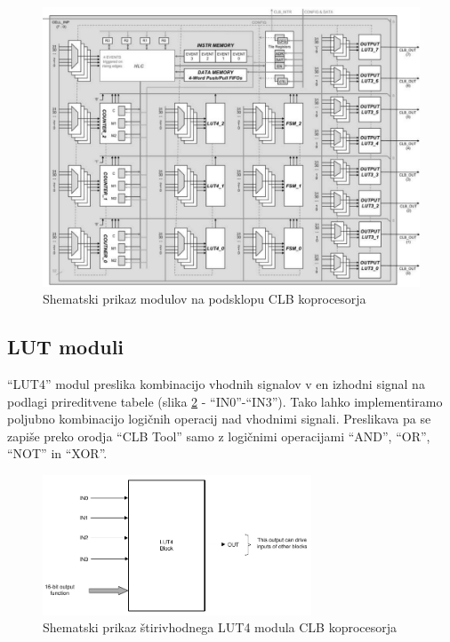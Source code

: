 \documentclass[a4paper]{article}
\begin{document}
\begin{sloppypar}
\begin{figure}[t]
    \begin{center}
        \begin{minipage}[t]{12cm}
            \includegraphics[width=12cm]{clb_moduli}
            \caption{Shematski prikaz modulov na podsklopu CLB koprocesorja
                     \cite[Pogl.~2.3.3]{fpga-to-clb}}
            \label{fig:clb_moduli}
        \end{minipage}
    \end{center}
\end{figure}

\subsection{LUT moduli}\label{sec:lut}
``LUT4'' modul preslika kombinacijo vhodnih signalov v en izhodni signal na
podlagi prireditvene tabele (slika \ref{fig:lut4} - ``IN0''-``IN3''). Tako
lahko implementiramo poljubno kombinacijo logičnih operacij nad vhodnimi
signali. Preslikava pa se zapiše preko orodja ``CLB Tool'' samo z logičnimi
operacijami ``AND'', ``OR'', ``NOT'' in
``XOR''\cite[Pogl.~3.3]{clb-user-guide}. 

\begin{figure}[htb]
    \centerline{\includegraphics[width=8cm]{shema_lut}}
    \caption{Shematski prikaz štirivhodnega LUT4 modula CLB koprocesorja
             \cite[Pogl.~26.4.4]{mcu-ref-manual}}
    \label{fig:lut4} 
\end{figure} 


\end{sloppypar}
\end{document}

